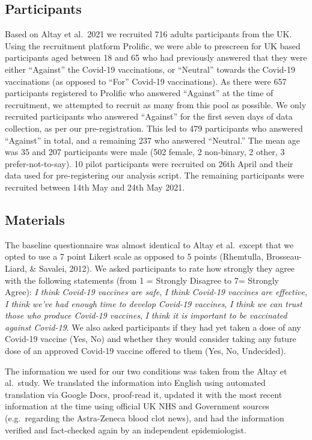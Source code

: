 \documentclass[
  english,
  ,jou,floatsintext]{apa6}
\begin{document}
\hypertarget{participants}{%
\subsection{Participants}\label{participants}}

Based on Altay et al.~2021 we recruited 716 adults participants from the UK. Using the recruitment platform Prolific, we were able to prescreen for UK based participants aged between 18 and 65 who had previously answered that they were either ``Against'' the Covid-19 vaccinations, or ``Neutral'' towards the Covid-19 vaccinations (as opposed to ``For'' Covid-19 vaccinations). As there were 657 participants registered to Prolific who answered ``Against'' at the time of recruitment, we attempted to recruit as many from this pool as possible. We only recruited participants who answered ``Against'' for the first seven days of data collection, as per our pre-registration. This led to 479 participants who answered ``Against'' in total, and a remaining 237 who answered ``Neutral.'' The mean age was 35 and 207 participants were male (502 female, 2 non-binary, 2 other, 3 prefer-not-to-say). 10 pilot participants were recruited on 26th April and their data used for pre-registering our analysis script. The remaining participants were recruited between 14th May and 24th May 2021.

\hypertarget{materials}{%
\subsection{Materials}\label{materials}}

The baseline questionnaire was almost identical to Altay et al.~except that we opted to use a 7 point Likert scale as opposed to 5 points (Rhemtulla, Brosseau-Liard, \& Savalei, 2012). We asked participants to rate how strongly they agree with the following statements (from 1 = Strongly Disagree to 7= Strongly Agree): \emph{I think Covid-19 vaccines are safe}, \emph{I think Covid-19 vaccines are effective}, \emph{I think we've had enough time to develop Covid-19 vaccines}, \emph{I think we can trust those who produce Covid-19 vaccines}, \emph{I think it is important to be vaccinated against Covid-19}. We also asked participants if they had yet taken a dose of any Covid-19 vaccine (Yes, No) and whether they would consider taking any future dose of an approved Covid-19 vaccine offered to them (Yes, No, Undecided).

The information we used for our two conditions was taken from the Altay et al.~study. We translated the information into English using automated translation via Google Docs, proof-read it, updated it with the most recent information at the time using official UK NHS and Government sources (e.g.~regarding the Astra-Zeneca blood clot news), and had the information verified and fact-checked again by an independent epidemiologist.
\end{document}
